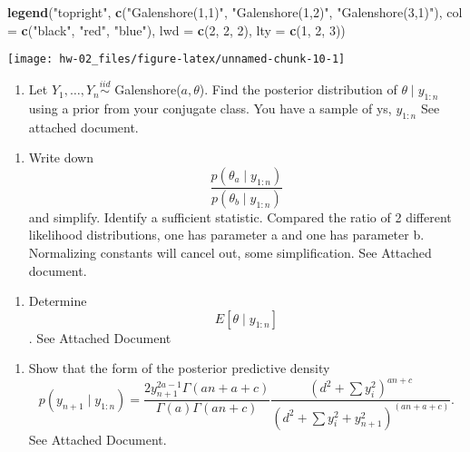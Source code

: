 \documentclass[
]{article}
\newenvironment{Shaded}{\begin{snugshade}}{\end{snugshade}}
\newcommand{\DataTypeTok}[1]{\textcolor[rgb]{0.13,0.29,0.53}{#1}}
\newcommand{\DecValTok}[1]{\textcolor[rgb]{0.00,0.00,0.81}{#1}}
\newcommand{\KeywordTok}[1]{\textcolor[rgb]{0.13,0.29,0.53}{\textbf{#1}}}
\newcommand{\NormalTok}[1]{#1}
\newcommand{\StringTok}[1]{\textcolor[rgb]{0.31,0.60,0.02}{#1}}
\providecommand{\tightlist}{%
  \setlength{\itemsep}{0pt}\setlength{\parskip}{0pt}}
\begin{document}
\begin{Shaded}
\begin{Highlighting}[]
\KeywordTok{legend}\NormalTok{(}\StringTok{"topright"}\NormalTok{, }\KeywordTok{c}\NormalTok{(}\StringTok{"Galenshore(1,1)"}\NormalTok{, }\StringTok{"Galenshore(1,2)"}\NormalTok{, }\StringTok{"Galenshore(3,1)"}\NormalTok{), }
    \DataTypeTok{col =} \KeywordTok{c}\NormalTok{(}\StringTok{"black"}\NormalTok{, }\StringTok{"red"}\NormalTok{, }\StringTok{"blue"}\NormalTok{), }\DataTypeTok{lwd =} \KeywordTok{c}\NormalTok{(}\DecValTok{2}\NormalTok{, }\DecValTok{2}\NormalTok{, }\DecValTok{2}\NormalTok{), }\DataTypeTok{lty =} \KeywordTok{c}\NormalTok{(}\DecValTok{1}\NormalTok{, }\DecValTok{2}\NormalTok{, }\DecValTok{3}\NormalTok{))}
\end{Highlighting}
\end{Shaded}

\begin{center}\texttt{[image: hw-02\_files/figure-latex/unnamed-chunk-10-1]} \end{center}

\item

\begin{enumerate}
\def\labelenumi{(\arabic{enumi})}
\setcounter{enumi}{4}
\tightlist
\item
  Let \(Y_1, \ldots, Y_n \stackrel{iid}{\sim}\)
  Galenshore(\(a, \theta\)). Find the posterior distribution of
  \(\theta \mid y_{1:n}\) using a prior from your conjugate class. You
  have a sample of ys, \(y_{1:n}\) See attached document.
\end{enumerate}

\item

\begin{enumerate}
\def\labelenumi{(\arabic{enumi})}
\setcounter{enumi}{9}
\tightlist
\item
  Write down
  \[\frac{p(\theta_a \mid y_{1:n})}{p(\theta_b \mid y_{1:n})}\] and
  simplify. Identify a sufficient statistic. Compared the ratio of 2
  different likelihood distributions, one has parameter a and one has
  parameter b. Normalizing constants will cancel out, some
  simplification. See Attached document.
\end{enumerate}

\item

\begin{enumerate}
\def\labelenumi{(\arabic{enumi})}
\setcounter{enumi}{4}
\tightlist
\item
  Determine \[E[\theta \mid y_{1:n}]\]. See Attached Document
\end{enumerate}

\item

\begin{enumerate}
\def\labelenumi{(\arabic{enumi})}
\setcounter{enumi}{9}
\tightlist
\item
  Show that the form of the posterior predictive density
  \[p(y_{n+1} \mid y_{1:n}) =  \frac{2 y_{n+1}^{2a - 1} \Gamma(an + a + c)}{\Gamma(a)\Gamma(an + c)}
  \frac{(d^2 + \sum y_i^2)^{an + c}}{(d^2 + \sum y_i^2 + y_{n+1}^2)^{(an + a + c)}}.\]
  See Attached Document.
\end{enumerate}
\end{document}
